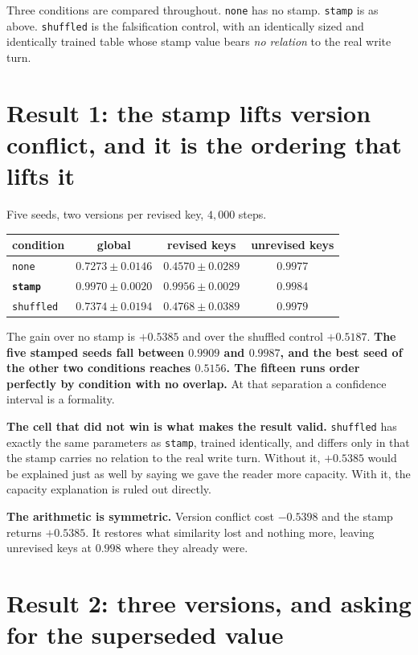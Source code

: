 \documentclass[11pt,a4paper]{article}
\begin{document}
Three conditions are compared throughout. \texttt{none} has no stamp. \texttt{stamp} is as above.
\texttt{shuffled} is the falsification control, with an identically sized and identically trained
table whose stamp value bears \emph{no relation} to the real write turn.

\section{Result 1: the stamp lifts version conflict, and it is the ordering that lifts it}

Five seeds, two versions per revised key, $4{,}000$ steps.

\begin{center}
\begin{tabular}{lccc}
\toprule
condition & global & \textbf{revised keys} & unrevised keys \\
\midrule
\texttt{none} & $0.7273 \pm 0.0146$ & $0.4570 \pm 0.0289$ & $0.9977$ \\
\textbf{\texttt{stamp}} & $\mathbf{0.9970 \pm 0.0020}$ & $\mathbf{0.9956 \pm 0.0029}$ & $0.9984$ \\
\texttt{shuffled} & $0.7374 \pm 0.0194$ & $0.4768 \pm 0.0389$ & $0.9979$ \\
\bottomrule
\end{tabular}
\end{center}

The gain over no stamp is $+0.5385$ and over the shuffled control $+0.5187$. \textbf{The five stamped
seeds fall between $0.9909$ and $0.9987$, and the best seed of the other two conditions reaches
$0.5156$. The fifteen runs order perfectly by condition with no overlap.} At that separation a
confidence interval is a formality.

\textbf{The cell that did not win is what makes the result valid.} \texttt{shuffled} has exactly the
same parameters as \texttt{stamp}, trained identically, and differs only in that the stamp carries no
relation to the real write turn. Without it, $+0.5385$ would be explained just as well by saying we
gave the reader more capacity. With it, the capacity explanation is ruled out directly.

\textbf{The arithmetic is symmetric.} Version conflict cost $-0.5398$ and the stamp returns $+0.5385$.
It restores what similarity lost and nothing more, leaving unrevised keys at $0.998$ where they
already were.

\section{Result 2: three versions, and asking for the superseded value}
\end{document}
